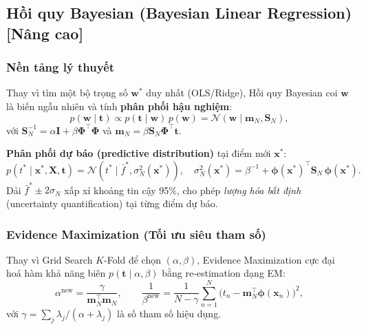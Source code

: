 \documentclass[12pt,a4paper]{article}
\begin{document}
\subsection{Hồi quy Bayesian (Bayesian Linear Regression) [Nâng cao]}
\label{ssec:bayesian}

\subsubsection{Nền tảng lý thuyết}

Thay vì tìm một bộ trọng số $\mathbf{w}^*$ duy nhất (OLS/Ridge), Hồi quy Bayesian
coi $\mathbf{w}$ là biến ngẫu nhiên và tính \textbf{phân phối hậu nghiệm}:
\begin{equation}
  p(\mathbf{w} \mid \mathbf{t}) \propto p(\mathbf{t} \mid \mathbf{w})\,p(\mathbf{w})
  = \mathcal{N}(\mathbf{w} \mid \mathbf{m}_N, \mathbf{S}_N),
  \label{eq:bayes_posterior}
\end{equation}
với $\mathbf{S}_N^{-1} = \alpha\mathbf{I} + \beta\boldsymbol{\Phi}^\top\boldsymbol{\Phi}$
và $\mathbf{m}_N = \beta\mathbf{S}_N\boldsymbol{\Phi}^\top\mathbf{t}$.

\textbf{Phân phối dự báo (predictive distribution)} tại điểm mới $\mathbf{x}^*$:
\begin{equation}
  p(t^* \mid \mathbf{x}^*, \mathbf{X}, \mathbf{t})
  = \mathcal{N}\!\left(t^* \mid \bar{f}^*, \sigma_N^2(\mathbf{x}^*)\right),
  \quad
  \sigma_N^2(\mathbf{x}^*) = \beta^{-1} + \boldsymbol{\phi}(\mathbf{x}^*)^\top
                              \mathbf{S}_N\,\boldsymbol{\phi}(\mathbf{x}^*).
  \label{eq:bayes_pred}
\end{equation}
Dải $\bar{f}^* \pm 2\sigma_N$ xấp xỉ khoảng tin cậy 95\%, cho phép
\emph{lượng hóa bất định} (uncertainty quantification) tại từng điểm dự báo.

\subsubsection{Evidence Maximization (Tối ưu siêu tham số)}

Thay vì Grid Search $K$-Fold để chọn $(\alpha, \beta)$, Evidence Maximization
cực đại hoá hàm khả năng biên $p(\mathbf{t} \mid \alpha, \beta)$ bằng
re-estimation dạng EM:
\begin{equation}
  \alpha^{\text{new}} = \frac{\gamma}{\mathbf{m}_N^\top\mathbf{m}_N},
  \qquad
  \frac{1}{\beta^{\text{new}}} = \frac{1}{N - \gamma}
  \sum_{n=1}^N \bigl(t_n - \mathbf{m}_N^\top\boldsymbol{\phi}(\mathbf{x}_n)\bigr)^2,
  \label{eq:em_update}
\end{equation}
với $\gamma = \sum_j \lambda_j/(\alpha + \lambda_j)$ là số tham số hiệu dụng.
\end{document}
